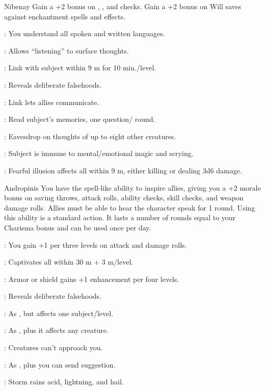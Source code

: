 {Nibenay}
{Gain a +2 bonus on , , and  checks. Gain a +2 bonus on Will saves against enchantment spells and effects.}
{
	\item {}: You understand all spoken and written languages.
	\item {}: Allows ``listening'' to surface thoughts.
	\item {}: Link with subject within 9 m for 10 min./level.
	\item {}: Reveals deliberate falsehoods.
	\item {}: Link lets allies communicate.
	\item {}: Read subject's memories, one question/ round.
	\item {}: Eavesdrop on thoughts of up to eight other creatures.
	\item {}: Subject is immune to mental/emotional magic and scrying.
	\item {}: Fearful illusion affects all within 9 m, either killing or dealing 3d6 damage.
}

{Andropinis}
{You have the spell-like ability to inspire allies, giving you a +2 morale bonus on saving throws, attack rolls, ability checks, skill checks, and weapon damage rolls. Allies must be able to hear the character speak for 1 round. Using this ability is a standard action. It lasts a number of rounds equal to your Charisma bonus and can be used once per day.}
{
	\item {}: You gain +1 per three levels on attack and damage rolls.
	\item {}: Captivates all within 30 m + 3 m/level.
	\item {}: Armor or shield gains +1 enhancement per four levels.
	\item {}: Reveals deliberate falsehoods.
	\item {}: As , but affects one subject/level.
	\item {}: As , plus it affects any creature.
	\item {}: Creatures can't approach you.
	\item {}: As , plus you can send suggestion.
	\item {}: Storm rains acid, lightning, and hail.
}

